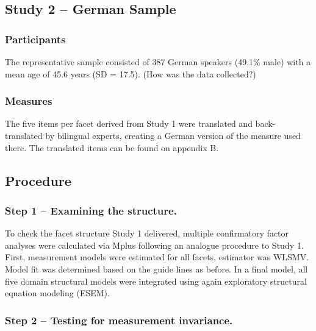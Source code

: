 \documentclass[man]{apa6}
\theoremstyle{definition}
\theoremstyle{definition}
\theoremstyle{definition}
\theoremstyle{remark}
\begin{document}
\hypertarget{study-2-german-sample}{%
\subsection{Study 2 -- German Sample}\label{study-2-german-sample}}

\hypertarget{participants-1}{%
\subsubsection{Participants}\label{participants-1}}

The representative sample consisted of 387 German speakers (49.1\% male)
with a mean age of 45.6 years (SD = 17.5). (How was the data collected?)

\hypertarget{measures}{%
\subsubsection{Measures}\label{measures}}

The five items per facet derived from Study 1 were translated and
back-translated by bilingual experts, creating a German version of the
measure used there. The translated items can be found on appendix B.

\hypertarget{procedure-1}{%
\subsection{Procedure}\label{procedure-1}}

\hypertarget{step-1-examining-the-structure.}{%
\subsubsection{Step 1 -- Examining the
structure.}\label{step-1-examining-the-structure.}}

To check the facet structure Study 1 delivered, multiple confirmatory
factor analyses were calculated via Mplus following an analogue
procedure to Study 1. First, measurement models were estimated for all
facets, estimator was WLSMV. Model fit was determined based on the guide
lines as before. In a final model, all five domain structural models
were integrated using again exploratory structural equation modeling
(ESEM).

\hypertarget{step-2-testing-for-measurement-invariance.}{%
\subsubsection{Step 2 -- Testing for measurement
invariance.}\label{step-2-testing-for-measurement-invariance.}}
\end{document}
